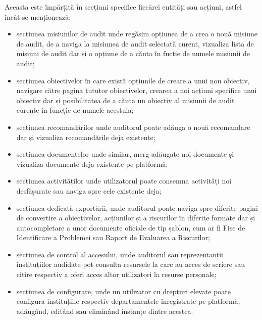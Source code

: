 	Aceasta este împărțită în secțiuni specifice fiecărei entități sau acțiuni, astfel încât se menționează: 
	\begin{itemize}
		\item  secțiunea misiunilor de audit unde regăsim opțiunea de a crea o nouă misiune de audit, de a naviga la misiunea de audit selectată curent, vizualiza lista de misiuni de audit dar și o opțiune de a căuta în fucție de numele misiunii de audit; 
		
		\item secțiunea obiectivelor în care există opțiunile de creare a unui nou obiectiv, navigare către pagina tututor obiectivelor, crearea a noi acțiuni specifice unui obiectiv dar și posibilitatea de a căuta un obiectiv al misiunii de audit curente în funcție de numele acestuia;
		
		\item secțiunea recomandărilor unde auditorul poate adăuga o nouă recomandare dar și vizualiza recomandările deja existente;
		
		\item secțiunea documentelor unde similar, merg adăugate noi documente și vizualiza documente deja existente pe platformă;
		
		\item secțiunea activităților unde utilizatorul poate consemna activități noi desfășurate sau naviga spre cele existente deja;
		
		\item secțiunea dedicată exportării, unde auditorul poate naviga spre diferite pagini de convertire a obiectivelor, acțiunilor și a riscurilor în diferite formate dar și autocompletare a unor documente oficiale de tip șablon, cum ar fi Fișe de Identificare a Problemei sau Raport de Evaluarea a Riscurilor;
		
		\item secțiunea de control al accesului, unde auditorul sau reprezentanții instituțiilor audidate pot consulta resursele la care au acces de scriere sau citire respectiv a oferi acces altor utilizatori la resurse personale;
		
		\item secțiunea de configurare, unde un utilizator cu drepturi elevate poate configura instituțiile respectiv departamentele înregistrate pe platformă, adăugând, editând sau eliminând instanțe dintre acestea.
		
		
		
		

	\end{itemize}
